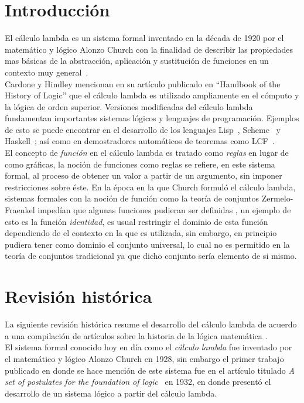\section{Introducción}

El cálculo lambda es un sistema formal inventado en la década de 1920 por el
matemático y lógico Alonzo Church con la finalidad de describir las propiedades
mas básicas de la abstracción, aplicación y sustitución de funciones en un
contexto muy general~\cite{CardoneHindley:History}.\\

Cardone y Hindley mencionan en su artículo publicado en ``Handbook of the
History of Logic'' que el cálculo lambda es utilizado ampliamente en el cómputo
y la lógica de orden superior. Versiones modificadas del cálculo lambda
fundamentan importantes sistemas lógicos y lenguajes de programación. Ejemplos
de esto se puede encontrar en el desarrollo de los lenguajes
Lisp~\cite{Lisp:first}, Scheme~\cite{Scheme:first} y Haskell~\cite{Haskell:first};
así como en demostradores automáticos de teoremas como LCF~\cite{ML:first}.\\

El concepto de \emph{función} en el cálculo lambda es tratado como \emph{reglas}
en lugar de como gráficas, la noción de funciones como reglas se refiere, en
este sistema formal, al proceso de obtener un valor a partir de un argumento,
sin imponer restricciones sobre éste. En la época en la que Church formuló el
cálculo lambda, sistemas formales con la noción de función como la teoría de
conjuntos Zermelo-Fraenkel impedían que algunas funciones pudieran ser definidas
\cite{Barendregt:Bible}, un ejemplo de esto es la función \emph{identidad}, es
usual restringir el dominio de esta función dependiendo de el contexto en la que
es utilizada, sin embargo, en principio pudiera tener como dominio el conjunto
universal, lo cual no es permitido en la teoría de conjuntos tradicional ya que
dicho conjunto sería elemento de si mismo.\\

\section{Revisión histórica}
La siguiente revisión histórica resume el desarrollo del cálculo lambda de
acuerdo a una compilación de artículos sobre la historia de la lógica matemática
\cite{CardoneHindley:History}.\\

El sistema formal conocido hoy en día como el \emph{cálculo lambda} fue inventado por
el matemático y lógico Alonzo Church en 1928, sin embargo el primer
trabajo publicado en donde se hace mención de este sistema fue en el
artículo titulado \emph{A set of postulates for the foundation of
  logic}~\cite{Church:FoundationsLogic} en 1932, en donde presentó el desarrollo
de un sistema lógico a partir del cálculo lambda.\\

